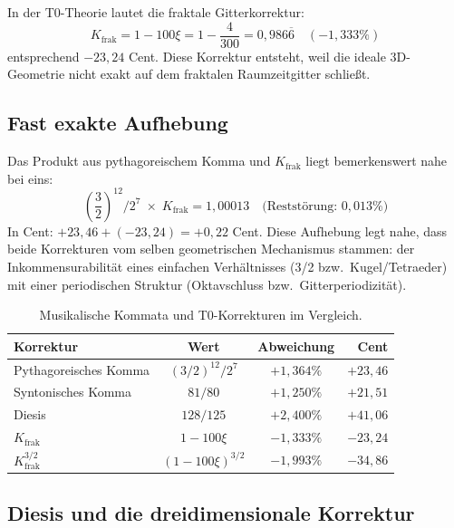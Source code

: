 In der T0-Theorie lautet die fraktale Gitterkorrektur:
\begin{equation}
	K_\text{frak} = 1 - 100\xi = 1 - \frac{4}{300} = 0{,}986\overline{6} \quad (-1{,}333\%)
\end{equation}
entsprechend $-23{,}24$ Cent. Diese Korrektur entsteht, weil die ideale 3D-Geometrie nicht exakt auf dem fraktalen Raumzeitgitter schließt.

\subsection{Fast exakte Aufhebung}

Das Produkt aus pythagoreischem Komma und $K_\text{frak}$ liegt bemerkenswert nahe bei eins:
\begin{equation}
	\left(\frac{3}{2}\right)^{12} \Big/ 2^7 \;\times\; K_\text{frak} = 1{,}00013 \quad \text{(Reststörung: } 0{,}013\%\text{)}
\end{equation}
In Cent: $+23{,}46 + (-23{,}24) = +0{,}22$ Cent. Diese Aufhebung legt nahe, dass beide Korrekturen vom selben geometrischen Mechanismus stammen: der Inkommensurabilität eines einfachen Verhältnisses (3/2 bzw.\ Kugel/Tetraeder) mit einer periodischen Struktur (Oktavschluss bzw.\ Gitterperiodizität).

\begin{table}[h]
\centering
\begin{tabular}{lccr}
	\toprule
	Korrektur & Wert & Abweichung & Cent\\
	\midrule
	Pythagoreisches Komma & $(3/2)^{12}/2^7$ & $+1{,}364\%$ & $+23{,}46$\\
	Syntonisches Komma & $81/80$ & $+1{,}250\%$ & $+21{,}51$\\
	Diesis & $128/125$ & $+2{,}400\%$ & $+41{,}06$\\
	\midrule
	$K_\text{frak}$ & $1 - 100\xi$ & $-1{,}333\%$ & $-23{,}24$\\
	$K_\text{frak}^{3/2}$ & $(1-100\xi)^{3/2}$ & $-1{,}993\%$ & $-34{,}86$\\
	\bottomrule
\end{tabular}
\caption{Musikalische Kommata und T0-Korrekturen im Vergleich.}
\label{tab:kommas}
\end{table}

\subsection{Diesis und die dreidimensionale Korrektur}

